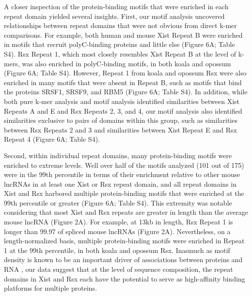 A closer inspection of the protein-binding motifs that were enriched in each repeat domain yielded several insights. First, our motif analysis uncovered relationships between repeat domains that were not obvious from direct k-mer comparisons. For example, both human and mouse Xist Repeat B were enriched in motifs that recruit polyC-binding proteins and little else (Figure 6A; Table S4). Rsx Repeat 1, which most closely resembles Xist Repeat B at the level of k-mers, was also enriched in polyC-binding motifs, in both koala and opossum (Figure 6A; Table S4). However, Repeat 1 from koala and opossum Rsx were also enriched in many motifs that were absent in Repeat B, such as motifs that bind the proteins SRSF1, SRSF9, and RBM5 (Figure 6A; Table S4). In addition, while both pure k-mer analysis and motif analysis identified similarities between Xist Repeats A and E and Rsx Repeats 2, 3, and 4, our motif analysis also identified similarities exclusive to pairs of domains within this group, such as similarities between Rsx Repeats 2 and 3 and similarities between Xist Repeat E and Rsx Repeat 4 (Figure 6A; Table S4). 

Second, within individual repeat domains, many protein-binding motifs were enriched to extreme levels. Well over half of the motifs analyzed (101 out of 175) were in the 99th percentile in terms of their enrichment relative to other mouse lncRNAs in at least one Xist or Rsx repeat domain, and all repeat domains in Xist and Rsx harbored multiple protein-binding motifs that were enriched at the 99th percentile or greater (Figure 6A; Table S4). This extremity was notable considering that most Xist and Rsx repeats are greater in length than the average mouse lncRNA (Figure 2A). For example, at 13kb in length, Rsx Repeat 1 is longer than 99.97 of spliced mouse lncRNAs (Figure 2A). Nevertheless, on a length-normalized basis, multiple protein-binding motifs were enriched in Repeat 1 at the 99th percentile, in both koala and opossum Rsx. Inasmuch as motif density is known to be an important driver of associations between proteins and RNA \cite{Dominguez2018SequenceProteins,Kirk2018FunctionalContent,VanNostrand2016RobusteCLIP}, our data suggest that at the level of sequence composition, the repeat domains in Xist and Rsx each have the potential to serve as high-affinity binding platforms for multiple proteins.

